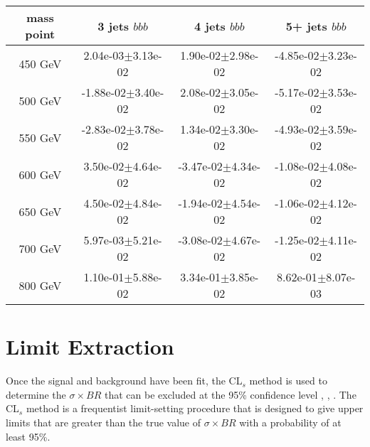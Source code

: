 \begin{table}
    \center
    \caption{\label{tab:Slopes_bbloose}}
    \begin{tabular}{ c c c c } \hline \hline
        mass point & 3 jets $bbb$ & 4 jets $bbb$ & 5+ jets $bbb$ \\ \hline
        450 GeV & 2.04e-03$\pm$3.13e-02 & 1.90e-02$\pm$2.98e-02 & -4.85e-02$\pm$3.23e-02 \\
        500 GeV & -1.88e-02$\pm$3.40e-02 & 2.08e-02$\pm$3.05e-02 & -5.17e-02$\pm$3.53e-02 \\
        550 GeV & -2.83e-02$\pm$3.78e-02 & 1.34e-02$\pm$3.30e-02 & -4.93e-02$\pm$3.59e-02 \\
        600 GeV & 3.50e-02$\pm$4.64e-02 & -3.47e-02$\pm$4.34e-02 & -1.08e-02$\pm$4.08e-02 \\
        650 GeV & 4.50e-02$\pm$4.84e-02 & -1.94e-02$\pm$4.54e-02 & -1.06e-02$\pm$4.12e-02 \\
        700 GeV & 5.97e-03$\pm$5.21e-02 & -3.08e-02$\pm$4.67e-02 & -1.25e-02$\pm$4.11e-02 \\
        800 GeV & 1.10e-01$\pm$5.88e-02 & 3.34e-01$\pm$3.85e-02 & 8.62e-01$\pm$8.07e-03 \\
    \end{tabular}
\end{table}





\section{Limit Extraction}
Once the signal and background have been fit, the CL$_s$ method is used to 
determine the $\sigma\times BR$ that can be excluded at the 95\% confidence
level \cite{CLS1}, \cite{CLS2}, \cite{CLS3}.  The CL$_s$ method is a
frequentist limit-setting procedure that is designed to give upper limits that
are greater than the true value of $\sigma\times BR$ with a probability of at
least 95\%.


